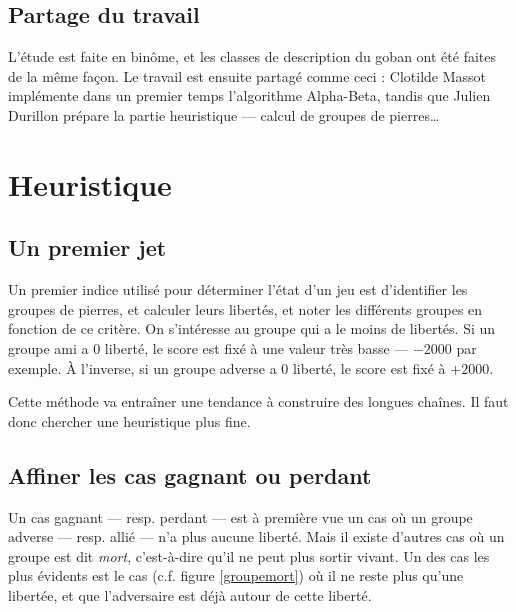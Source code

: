 \documentclass[11pt,a4paper,titlepage,french]{article}
\begin{document}
		\subsection{Partage du travail}
			L'étude est faite en binôme, et les classes de description du goban ont été faites de la même façon. Le travail est ensuite partagé comme ceci : Clotilde Massot implémente dans un premier temps l'algorithme Alpha-Beta, tandis que Julien Durillon prépare la partie heuristique --- calcul de groupes de pierres\dots %


	\section{Heuristique}

		\subsection{Un premier jet}
			Un premier indice utilisé pour déterminer l'état d'un jeu est d'identifier les groupes de pierres, et calculer leurs libertés, et noter les différents groupes en fonction de ce critère. On s'intéresse au groupe qui a le moins de libertés. Si un groupe ami a 0 liberté, le score est fixé à une valeur très basse --- $-2000$ par exemple. À l'inverse, si un groupe adverse a 0 liberté, le score est fixé à $+2000$.

			Cette méthode va entraîner une tendance à construire des longues chaînes. Il faut donc chercher une heuristique plus fine.

		\subsection{Affiner les cas gagnant ou perdant}
			Un cas gagnant --- resp. perdant --- est à première vue un cas où un groupe adverse --- resp. allié --- n'a plus aucune liberté. Mais il existe d'autres cas où un groupe est dit \emph{mort}, c'est-à-dire qu'il ne peut plus sortir vivant. Un des cas les plus évidents est le cas (c.f. figure \ref{groupemort}) où il ne reste plus qu'une libertée, et que l'adversaire est déjà autour de cette liberté.
\end{document}

